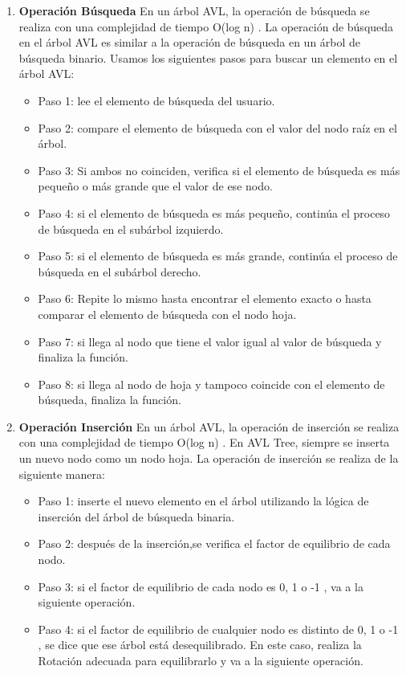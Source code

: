 \documentclass{article}
\begin{document}
	\begin{enumerate}

		\item \textbf{Operación Búsqueda}
	En un árbol AVL, la operación de búsqueda se realiza con una complejidad de tiempo O(log n) . La operación de búsqueda en el árbol AVL es similar a la operación de búsqueda en un árbol de búsqueda binario. Usamos los siguientes pasos para buscar un elemento en el árbol AVL:
		
		\begin{itemize}
		\item Paso 1: lee el elemento de búsqueda del usuario.
		\item Paso 2: compare el elemento de búsqueda con el valor del nodo raíz en el árbol.
		\item Paso 3: Si ambos no coinciden, verifica si el elemento de búsqueda es más pequeño o más grande que el valor de ese nodo.
		\item Paso 4: si el elemento de búsqueda es más pequeño, continúa el proceso de búsqueda en el subárbol izquierdo.
		\item Paso 5: si el elemento de búsqueda es más grande, continúa el proceso de búsqueda en el subárbol derecho.
		\item Paso 6: Repite lo mismo hasta encontrar el elemento exacto o hasta comparar el elemento de búsqueda con el nodo hoja.
		\item Paso 7: si llega al nodo que tiene el valor igual al valor de búsqueda y finaliza la función.
		\item Paso 8: si llega al nodo de hoja y tampoco coincide con el elemento de búsqueda, finaliza la función.
		\end{itemize}


		\item \textbf{Operación Inserción}
		En un árbol AVL, la operación de inserción se realiza con una complejidad de tiempo O(log n) . En AVL Tree, siempre se inserta un nuevo nodo como un nodo hoja. La operación de inserción se realiza de la siguiente manera:
		\begin{itemize}
		\item Paso 1: inserte el nuevo elemento en el árbol utilizando la lógica de inserción del árbol de búsqueda binaria.
		\item Paso 2: después de la inserción,se verifica el factor de equilibrio de cada nodo.
		\item Paso 3: si el factor de equilibrio de cada nodo es 0, 1 o -1 , va a la siguiente operación.
		\item Paso 4: si el factor de equilibrio de cualquier nodo es distinto de 0, 1 o -1 , se dice que ese árbol está desequilibrado. En este caso, realiza la Rotación adecuada para equilibrarlo y va a la siguiente operación.
				\end{itemize}
				

\end{enumerate}
\end{document}

